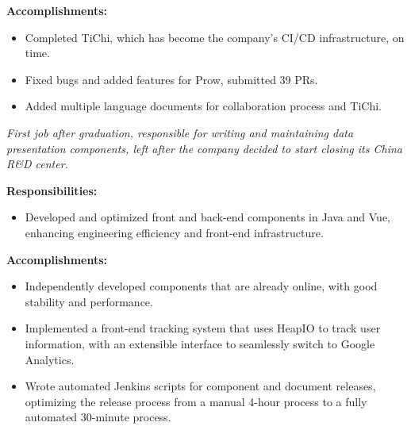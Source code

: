 \documentclass{software_engineer_rustin_liu}
\newcommand{\en}[1]{#1}
\newcommand{\zh}[1]{}
\begin{document}
\en{\textbf{Accomplishments:}}
\zh{\textbf{产出：}}
\begin{itemize}
      \item \en{Completed TiChi, which has become the company’s CI/CD infrastructure, on time.}
            \zh{按时完成了项目的设计和开发，TiChi 已经成为了公司 CI/CD 的基础设施。}
      \item \en{Fixed bugs and added features for Prow, submitted 39 PRs.}
            \zh{为 Prow 修复 bug 和添加功能，提交了 39 个 PR。}
      \item \en{Added multiple language documents for collaboration process and TiChi.}
            \zh{为 TiChi 编写了良好的文档，明确了协作流程，为开源贡献者提供了更好的协作体验。}
\end{itemize}

\en{}
\zh{\datedsubsection{\textbf{\href{https://www.morningstar.com/}{晨星资讯（Morningstar, Inc.）- 金融服务 - 前后端开发工程师（Java/JS）}}}{2019/06 -- 2020/07}}
\en{\textsl{First job after graduation, responsible for writing and maintaining data presentation components, left after the company decided to start closing its China R\&D center.}}
\zh{\textsl{毕业后第一份工作，负责编写和维护数据展示组件，在公司决定开始关闭中国研发中心后离职。}}

\en{\textbf{Responsibilities:}}
\zh{\textbf{职责：}}
\begin{itemize}
      \item \en{Developed and optimized front and back-end components in Java and Vue, enhancing engineering efficiency and front-end infrastructure.}
            \zh{使用 Java 和 Vue 开发和优化前后端组件，提升工程效率和前端基础设施。}
\end{itemize}

\en{\textbf{Accomplishments:}}
\zh{\textbf{产出：}}
\begin{itemize}
      \item \en{Independently developed components that are already online, with good stability and performance.}
            \zh{多个独立开发的组件已经上线使用，有较好的稳定性和性能。}
      \item \en{Implemented a front-end tracking system that uses HeapIO to track user information, with an extensible interface to seamlessly switch to Google Analytics.}
            \zh{实现了前端的 tracking 系统，使用 HeapIO 追踪用户信息，并预留可扩展接口，可无缝切换至 Google Analytics。}
      \item \en{Wrote automated Jenkins scripts for component and document releases, optimizing the release process from a manual 4-hour process to a fully automated 30-minute process.}
            \zh{为组件和文档发布编写了自动化 Jenkins 脚本，将发布流程从手动 4 小时优化到全自动 30 分钟。}
\end{itemize}
\end{document}
